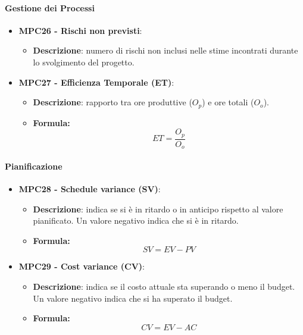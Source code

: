 \documentclass[10pt]{article}
\begin{document}
\begin{justify}
\paragraph{Gestione dei Processi}
\begin{itemize}
    \item \textbf{MPC26 - Rischi non previsti}:
        \begin{itemize}
            \item \textbf{Descrizione}: numero di rischi non inclusi nelle stime incontrati durante lo svolgimento del progetto.
        \end{itemize}
    \item \textbf{MPC27 - Efficienza Temporale (ET)}:
    \begin{itemize}
        \item   \textbf{Descrizione}: rapporto tra ore produttive ($O_p$) e ore totali ($O_o$).
        \item   \textbf{Formula:}
            \[
            ET = \frac{O_p}{O_o}
            \]
    \end{itemize}
\end{itemize}

\paragraph{Pianificazione}
\begin{itemize}
    \item \textbf{MPC28 - Schedule variance (SV)}:

    \begin{itemize}
        \item   \textbf{Descrizione}: indica se si è in ritardo o in anticipo rispetto al valore pianificato. Un valore negativo indica che si è in ritardo.
        \item   \textbf{Formula:}
            \[
            SV = EV - PV
            \]
    \end{itemize}
    \item \textbf{MPC29 - Cost variance (CV)}:

    \begin{itemize}
        \item   \textbf{Descrizione}: indica se il costo attuale sta superando o meno il budget. Un valore negativo indica che si ha superato il budget.
        \item   \textbf{Formula:}
            \[
            CV = EV - AC
            \]
    \end{itemize}
\end{itemize}

\end{justify}
\end{document}
